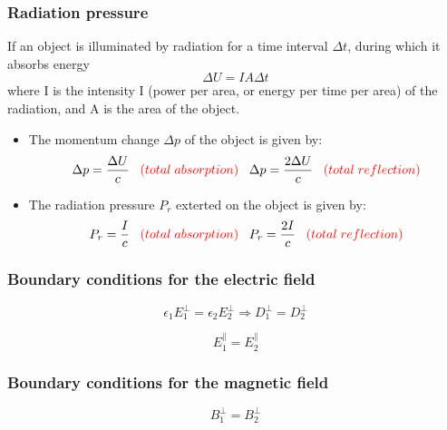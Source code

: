 \documentclass[english,11pt]{article}
\begin{document}
\subsubsection*{\bf Radiation pressure}

If an object is illuminated by radiation for a time interval ${\Delta}t$,
during which it absorbs energy
\begin{equation*}
  {\Delta}U = IA{\Delta}t
\end{equation*}
where I is the intensity I (power per area, or energy per time
per area) of the radiation, and A is the area of the object.
\begin{itemize}
\item
The momentum change ${\Delta}p$ of the object is given by:
\begin{equation*}
    {\Delta}p = \frac{{\Delta}U}{c}
    \;\;\; {\color{red} \small (total \; absorption)}
    \;\;\;
    {\Delta}p = \frac{2{\Delta}U}{c}
    \;\;\; {\color{red} \small (total \; reflection)}
\end{equation*}
\item
The radiation pressure $P_r$ exterted on the object is given by:
\begin{equation*}
  P_r = \frac{I}{c}
  \;\;\; {\color{red} \small (total \; absorption)}
  \;\;\;
  P_r = \frac{2I}{c}
  \;\;\; {\color{red} \small (total \; reflection)}
\end{equation*}
\end{itemize}

\subsubsection*{\bf Boundary conditions for the electric field}

\begin{equation*}
    \epsilon_1 E_1^{\perp} = \epsilon_2 E_2^{\perp} \Rightarrow
    D_1^{\perp} = D_2^{\perp}
\end{equation*}

\begin{equation*}
    E_1^{\parallel} = E_2^{\parallel}
\end{equation*}

\subsubsection*{\bf Boundary conditions for the magnetic field}

\begin{equation*}
    B_1^{\perp} = B_2^{\perp}
\end{equation*}
\end{document}
